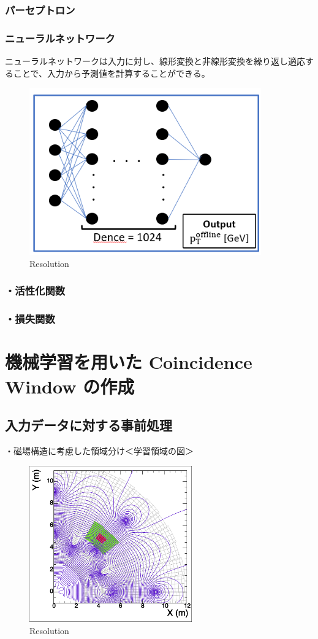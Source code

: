 \subsubsection{パーセプトロン}

\subsubsection{ニューラルネットワーク}
ニューラルネットワークは入力に対し、線形変換と非線形変換を繰り返し適応することで、入力から予測値を計算することができる。
\begin{figure}[tb]
  \centering
  \includegraphics[clip, width=10cm]{fig/4/MLP.png}
  \caption{Resolution}
  \label{fig:Resolution}
\end{figure}


\subsubsection{・活性化関数}

\subsubsection{・損失関数}

\section{機械学習を用いた Coincidence Window の作成}
\subsection{入力データに対する事前処理}
・磁場構造に考慮した領域分け＜学習領域の図＞\\
\begin{figure}[tb]
  \centering
  \includegraphics[clip, width=7cm]{fig/4/c1_withMag.pdf}
  \caption{Resolution}
  \label{fig:Resolution}
\end{figure}


